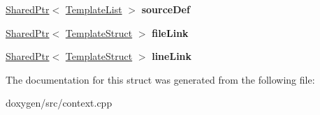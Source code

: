 \begin{DoxyCompactItemize}
\mbox{\hyperlink{class_shared_ptr}{Shared\+Ptr}}$<$ \mbox{\hyperlink{class_template_list}{Template\+List}} $>$ {\bfseries source\+Def}
\item 
\mbox{\label{struct_definition_context_1_1_cachable_ac643f38936a052f265377f6d5b145ec5}} 
\mbox{\hyperlink{class_shared_ptr}{Shared\+Ptr}}$<$ \mbox{\hyperlink{class_template_struct}{Template\+Struct}} $>$ {\bfseries file\+Link}
\item 
\mbox{\label{struct_definition_context_1_1_cachable_ad24ba5d0059a46d73cbb631fb01e8d98}} 
\mbox{\hyperlink{class_shared_ptr}{Shared\+Ptr}}$<$ \mbox{\hyperlink{class_template_struct}{Template\+Struct}} $>$ {\bfseries line\+Link}
\end{DoxyCompactItemize}


The documentation for this struct was generated from the following file\+:\begin{DoxyCompactItemize}
\item 
doxygen/src/context.\+cpp\end{DoxyCompactItemize}
